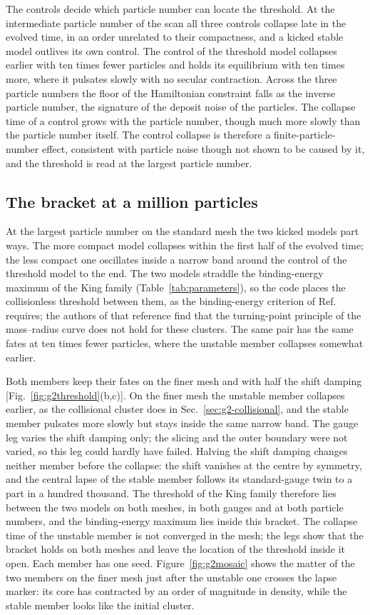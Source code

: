 \documentclass[aps,prd,twocolumn,10pt,superscriptaddress,nofootinbib,longbibliography,floatfix]{revtex4-2}
\begin{document}
The controls decide which particle number can locate the threshold. At the intermediate particle number of the scan all three controls collapse late in the evolved time, in an order unrelated to their compactness, and a kicked stable model outlives its own control. The control of the threshold model collapses earlier with ten times fewer particles and holds its equilibrium with ten times more, where it pulsates slowly with no secular contraction. Across the three particle numbers the floor of the Hamiltonian constraint falls as the inverse particle number, the signature of the deposit noise of the particles. The collapse time of a control grows with the particle number, though much more slowly than the particle number itself. The control collapse is therefore a finite-particle-number effect, consistent with particle noise though not shown to be caused by it, and the threshold is read at the largest particle number.

\subsection{The bracket at a million particles}\label{sec:g2-bracket}

At the largest particle number on the standard mesh the two kicked models part ways. The more compact model collapses within the first half of the evolved time; the less compact one oscillates inside a narrow band around the control of the threshold model to the end. The two models straddle the binding-energy maximum of the King family (Table~\ref{tab:parameters}), so the code places the collisionless threshold between them, as the binding-energy criterion of Ref.~\cite{Gunther:2020ev} requires; the authors of that reference find that the turning-point principle of the mass--radius curve does not hold for these clusters. The same pair has the same fates at ten times fewer particles, where the unstable member collapses somewhat earlier.

Both members keep their fates on the finer mesh and with half the shift damping [Fig.~\ref{fig:g2threshold}(b,c)]. On the finer mesh the unstable member collapses earlier, as the collisional cluster does in Sec.~\ref{sec:g2-collisional}, and the stable member pulsates more slowly but stays inside the same narrow band. The gauge leg varies the shift damping only; the slicing and the outer boundary were not varied, so this leg could hardly have failed. Halving the shift damping changes neither member before the collapse: the shift vanishes at the centre by symmetry, and the central lapse of the stable member follows its standard-gauge twin to a part in a hundred thousand. The threshold of the King family therefore lies between the two models on both meshes, in both gauges and at both particle numbers, and the binding-energy maximum lies inside this bracket. The collapse time of the unstable member is not converged in the mesh; the legs show that the bracket holds on both meshes and leave the location of the threshold inside it open. Each member has one seed. Figure~\ref{fig:g2mosaic} shows the matter of the two members on the finer mesh just after the unstable one crosses the lapse marker: its core has contracted by an order of magnitude in density, while the stable member looks like the initial cluster.
\end{document}

